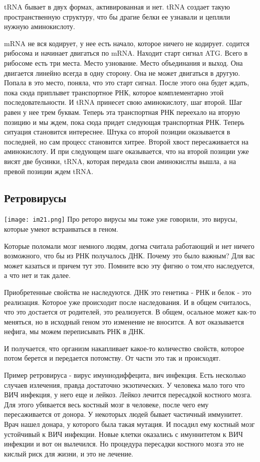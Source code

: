 tRNA бывает в двух формах, активированная и нет. tRNA создает такую пространственную
структуру, что бы драгие белки ее узнавали и цепляли нужную аминокислоту.

mRNA не вся кодирует, у нее есть начало, которое ничего не кодирует. содится рибосома и
начинает двигаться по mRNA. Находит старт сигнал ATG. Всего в рибосоме есть три места.
Место узнование. Место объединания и выход. Она двигается линейно всегда в одну сторону.
Она не может двигаться в другую. Попала в это место, поняла, что 
это старт сигнал. После этого она будет ждать, пока 
сюда приплывет транспортное РНК, которое комплементарно этой последовательности. 
И tRNA принесет свою аминокислоту, шаг второй. Шаг равен у нее трем буквам. Теперь эта 
транспортная РНК переехало на вторую позицию и мы ждем, пока сюда придет следующая 
транспортная РНК. Теперь ситуация становится интереснее. Штука со второй позиции оказывается 
в последней, но сам процесс становится хитрее. Второй хвост пересаживается на аминокислоту. 
И при следующем шаге оказывается, что на второй позиции уже висят две бусинки, tRNA, которая 
передала свои аминокислты вышла, а на превой позиции ждем tRNA.

\subsection{Ретровирусы}
\texttt{[image: im21.png]}
Про реторо вирусы мы тоже уже говорили, это вирусы, которые 
умеют встраиваться в геном. 

Которые поломали мозг немного людям, догма считала работающий и 
нет ничего возможного, что бы из РНК получалось ДНК. 
Почему это было важным? Для вас может казаться и причем тут это. 
Помните всю эту фигню о том,что наследуется, а что нет и так далее. 

Приобретенные свойства не наследуются. ДНК это генетика - РНК и белок - это 
реализация. Которое уже происходит после наследования. И в общем считалось, что 
это достается от родителей, это реализуется. В общем, осальное может как-то меняться, 
но в исходный геном это изменение не вносится. А вот оказывается нефига, 
мы можем переписывать РНК в ДНК. 

И получается, что организм накапливает какое-то количество свойств, 
которое потом берется и передается потомству. От части это так и происходят. 


Пример ретровируса - вирус имуннодиффецита, вич инфекция. Есть несколько 
случаев излечения, правда достаточно экзотических. У человека мало того что
ВИЧ инфекция, у него еще и лейкоз. Лейкоз лечится пересадкой костного мозга.
Для этого убивается весь костный мозг в человеке,
после чего ему пересаживается от донора. У некоторых
людей бывает частичный иммунитет. Врач нашел донара, у которого была такая
мутация. И посадил ему костный мозг устойчивый к ВИЧ инфекции. Новые клетки
оказались с имуннитетом к ВИЧ инфекции и вот он вылечился. Но процедура
пересадки костного мозга это не кислый риск для жизни, и это не лечение.

